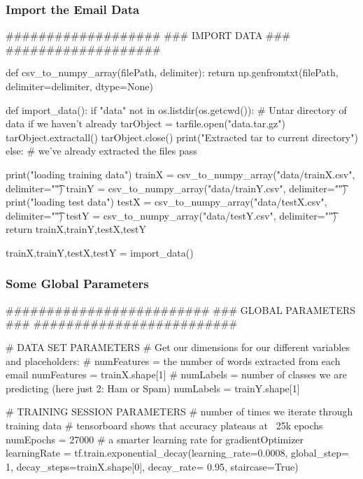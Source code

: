 \documentclass[14pt]{beamer}
\begin{document}
\begin{frame}[fragile]
  \frametitle{Import the Email Data}
  \begin{python}
###################
### IMPORT DATA ###
###################

def csv_to_numpy_array(filePath, delimiter):
    return np.genfromtxt(filePath, delimiter=delimiter, dtype=None)

def import_data():
    if "data" not in os.listdir(os.getcwd()):
        # Untar directory of data if we haven't already
        tarObject = tarfile.open("data.tar.gz")
        tarObject.extractall()
        tarObject.close()
        print("Extracted tar to current directory")
    else:
        # we've already extracted the files
        pass

    print("loading training data")
    trainX = csv_to_numpy_array("data/trainX.csv", delimiter="\t")
    trainY = csv_to_numpy_array("data/trainY.csv", delimiter="\t")
    print("loading test data")
    testX = csv_to_numpy_array("data/testX.csv", delimiter="\t")
    testY = csv_to_numpy_array("data/testY.csv", delimiter="\t")
    return trainX,trainY,testX,testY

trainX,trainY,testX,testY = import_data()
  \end{python}
\end{frame}



\begin{frame}[fragile]
  \frametitle{Some Global Parameters}
  \begin{python}
#########################
### GLOBAL PARAMETERS ###
#########################

# DATA SET PARAMETERS
# Get our dimensions for our different variables and placeholders:
# numFeatures = the number of words extracted from each email
numFeatures = trainX.shape[1]
# numLabels = number of classes we are predicting (here just 2: Ham or Spam)
numLabels = trainY.shape[1]

# TRAINING SESSION PARAMETERS
# number of times we iterate through training data
# tensorboard shows that accuracy plateaus at ~25k epochs
numEpochs = 27000
# a smarter learning rate for gradientOptimizer
learningRate = tf.train.exponential_decay(learning_rate=0.0008,
                                          global_step= 1,
                                          decay_steps=trainX.shape[0],
                                          decay_rate= 0.95,
                                          staircase=True)
  \end{python}
\end{frame}
\end{document}

